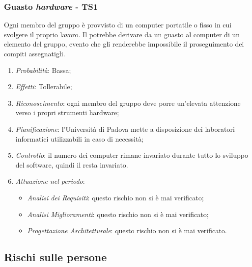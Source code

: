 \subsubsection{Guasto \textit{hardware} - TS1}
Ogni membro del gruppo \`e provvisto di un computer portatile o fisso in cui svolgere il proprio lavoro. Il  potrebbe derivare da un guasto al computer di un elemento del gruppo, evento che gli renderebbe impossibile il proseguimento dei compiti assegnatigli.
\begin{enumerate}
\item \textit{Probabilit\`a}: Bassa;
\item \textit{Effetti}: Tollerabile; 
\item \textit{Riconoscimento}: ogni membro del gruppo deve porre un’elevata attenzione verso i propri strumenti hardware;
\item \textit{Pianificazione}: l'Universit\`a di Padova mette a disposizione dei laboratori informatici utilizzabili
in caso di necessit\`a;
\item \textit{Controllo}: il numero dei computer rimane invariato durante tutto lo sviluppo del software, quindi il  resta invariato.
\item \textit{Attuazione nel periodo}: 
	\begin{itemize}
	\item \textit{Analisi dei Requisiti}: questo rischio non si è mai verificato;
	\item \textit{Analisi Miglioramenti}: questo rischio non si è mai verificato;
	\item \textit{Progettazione Architetturale}: questo rischio non si è mai verificato.
	\end{itemize}
\end{enumerate}

\subsection{Rischi sulle persone}
